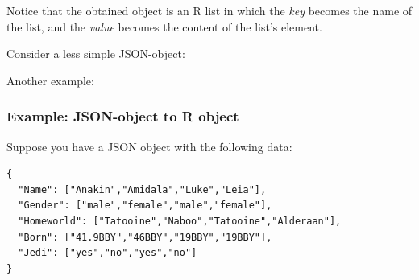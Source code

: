 \documentclass[
]{book}
\newenvironment{Shaded}{\begin{snugshade}}{\end{snugshade}}
\newcommand{\CommentTok}[1]{\textcolor[rgb]{0.56,0.35,0.01}{\textit{#1}}}
\newcommand{\FunctionTok}[1]{\textcolor[rgb]{0.13,0.29,0.53}{\textbf{#1}}}
\newcommand{\NormalTok}[1]{#1}
\newcommand{\OtherTok}[1]{\textcolor[rgb]{0.56,0.35,0.01}{#1}}
\newcommand{\StringTok}[1]{\textcolor[rgb]{0.31,0.60,0.02}{#1}}
\begin{document}
Notice that the obtained object is an R list in which the \emph{key} becomes the
name of the list, and the \emph{value} becomes the content of the list's element.

Consider a less simple JSON-object:

\begin{Shaded}
\end{Shaded}

Another example:

\begin{Shaded}
\end{Shaded}

\hypertarget{example-json-object-to-r-object-1}{%
\subsubsection*{Example: JSON-object to R object}\label{example-json-object-to-r-object-1}}

Suppose you have a JSON object with the following data:

\begin{verbatim}
{
  "Name": ["Anakin","Amidala","Luke","Leia"],
  "Gender": ["male","female","male","female"],
  "Homeworld": ["Tatooine","Naboo","Tatooine","Alderaan"],
  "Born": ["41.9BBY","46BBY","19BBY","19BBY"],
  "Jedi": ["yes","no","yes","no"]
}
\end{verbatim}
\end{document}
